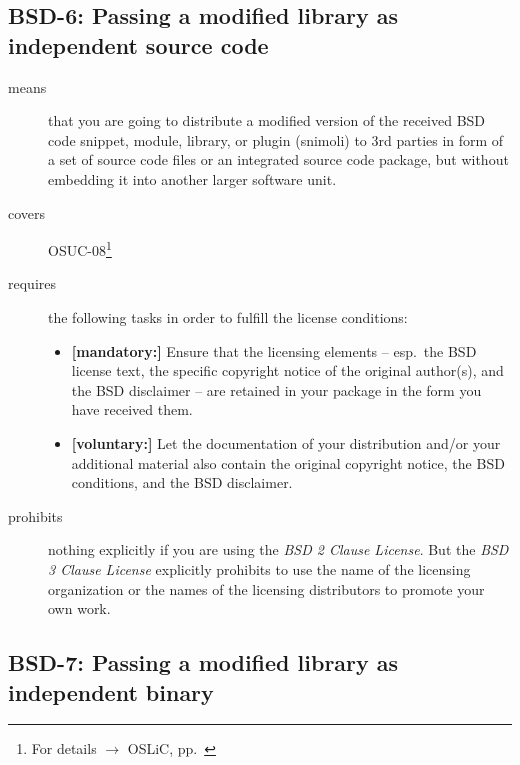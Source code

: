 \subsection{BSD-6: Passing a modified library as independent source code}
\label{OSUC-08-BSD}
\begin{description}
\item[means] that you are going to distribute a modified version of the received
BSD code snippet, module, library, or plugin (snimoli) to 3rd parties in form
of a set of source code files or an integrated source code package, but without
embedding it into another larger software unit.
\item[covers] OSUC-08\footnote{For details $\rightarrow$ OSLiC, pp.\ \pageref{OSUC-08-DEF}}
\item[requires] the following tasks in order to fulfill the license conditions:
\begin{itemize}
  \item \textbf{[mandatory:]} Ensure that the licensing elements -- esp.\ the
  BSD license text, the specific copyright notice of the original author(s), and
  the BSD disclaimer -- are retained in your package in the form you have
  received them.
  \item \textbf{[voluntary:]} Let the documentation of your distribution
  and/or your additional material also contain the original copyright notice, the
  BSD conditions, and the BSD disclaimer.
\end{itemize}

\item[prohibits] nothing explicitly if you are using the \emph{BSD 2 Clause
License}. But the \emph{BSD 3 Clause License} explicitly prohibits to use the
name of the licensing organization or the names of the licensing distributors to
promote your own work.

\end{description}


\subsection{BSD-7: Passing a modified library as independent binary}

